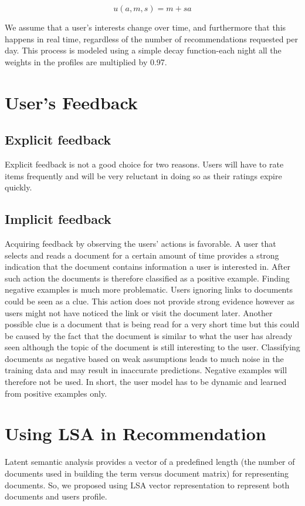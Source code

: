 \begin{equation}
u(a,m,s) =m+sa
\label{eq:feedback}
\end{equation}

We assume that a user's interests change over time, and furthermore that this happens in real time, regardless of the number of recommendations requested per day. This process is modeled using a simple decay function-each night all the weights in the profiles are multiplied by 0.97.
 
\section{User's Feedback}
\subsection{Explicit feedback}
Explicit feedback is not a good choice for two reasons. Users will have to rate items frequently and will be very reluctant in doing so as their ratings expire quickly.

\subsection{Implicit feedback}
Acquiring feedback by observing the users’ actions is favorable. A user that selects and reads a document for a certain amount of time provides a strong indication that the document contains information a user is interested in. After such action the documents is therefore classified as a positive example. Finding negative examples is much more problematic. Users ignoring links to documents could be seen as a clue. This action does not provide strong evidence however as users might not have noticed the link or visit the document later. Another possible clue is a document that is being read for a very short time but this could be caused by the fact that the document is similar to what the user has already seen although the topic of the document is still interesting to the user. Classifying documents as negative based on weak assumptions leads to much noise in the training data and may result in inaccurate predictions. Negative examples will therefore not be used. In short, the user model has to be dynamic and learned from positive examples only.
\section{Using LSA in Recommendation}
Latent semantic analysis provides a vector of a predefined length (the number of documents used in building the term versus document matrix) for representing documents.
So, we proposed using LSA vector representation to represent both documents and users profile.
